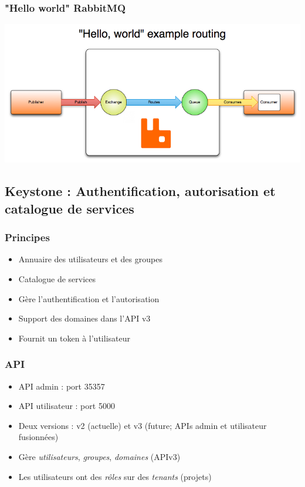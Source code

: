   \begin{frame}
    \frametitle{"Hello world" RabbitMQ}
    \includegraphics[width=\textwidth]{images/rabbitmq-schema.png}
  \end{frame}

  \subsection[Keystone]{Keystone : Authentification, autorisation et catalogue de services}

  \begin{frame}
    \frametitle{Principes}
    \begin{itemize}
      \item Annuaire des utilisateurs et des groupes
      \item Catalogue de services
      \item Gère l'authentification et l'autorisation
      \item Support des domaines dans l'API v3
      \item Fournit un token à l'utilisateur
    \end{itemize}
  \end{frame}

  \begin{frame}
    \frametitle{API}
    \begin{itemize}
      \item API admin : port 35357
      \item API utilisateur : port 5000
      \item Deux versions : v2 (actuelle) et v3 (future; APIs admin et utilisateur fusionnées)
      \item Gère \textit{utilisateurs}, \textit{groupes}, \textit{domaines} (APIv3)
      \item Les utilisateurs ont des \textit{rôles} sur des \textit{tenants} (projets)
    \end{itemize}
  \end{frame}

